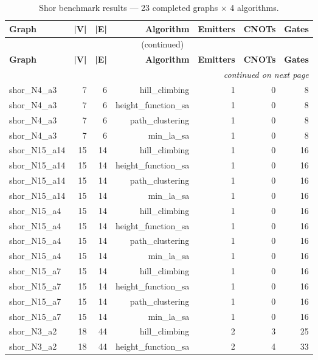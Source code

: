\begin{longtable}{lrrrrrr}
  \caption{Shor benchmark results — 23 completed graphs × 4 algorithms.} \label{tab:shor_results} \\
  \toprule
  \textbf{Graph} & \textbf{|V|} & \textbf{|E|} & \textbf{Algorithm} & \textbf{Emitters} & \textbf{CNOTs} & \textbf{Gates} \\
  \midrule
  \endfirsthead
  \multicolumn{7}{c}{\tablename\ \thetable{} (continued)} \\
  \toprule
  \textbf{Graph} & \textbf{|V|} & \textbf{|E|} & \textbf{Algorithm} & \textbf{Emitters} & \textbf{CNOTs} & \textbf{Gates} \\
  \midrule
  \endhead
  \midrule \multicolumn{7}{r}{\textit{continued on next page}} \\
  \endfoot
  \bottomrule
  \endlastfoot
  shor\_N4\_a3 & 7 & 6 & hill\_climbing & 1 & 0 & 8 \\
  shor\_N4\_a3 & 7 & 6 & height\_function\_sa & 1 & 0 & 8 \\
  shor\_N4\_a3 & 7 & 6 & path\_clustering & 1 & 0 & 8 \\
  shor\_N4\_a3 & 7 & 6 & min\_la\_sa & 1 & 0 & 8 \\
  shor\_N15\_a14 & 15 & 14 & hill\_climbing & 1 & 0 & 16 \\
  shor\_N15\_a14 & 15 & 14 & height\_function\_sa & 1 & 0 & 16 \\
  shor\_N15\_a14 & 15 & 14 & path\_clustering & 1 & 0 & 16 \\
  shor\_N15\_a14 & 15 & 14 & min\_la\_sa & 1 & 0 & 16 \\
  shor\_N15\_a4 & 15 & 14 & hill\_climbing & 1 & 0 & 16 \\
  shor\_N15\_a4 & 15 & 14 & height\_function\_sa & 1 & 0 & 16 \\
  shor\_N15\_a4 & 15 & 14 & path\_clustering & 1 & 0 & 16 \\
  shor\_N15\_a4 & 15 & 14 & min\_la\_sa & 1 & 0 & 16 \\
  shor\_N15\_a7 & 15 & 14 & hill\_climbing & 1 & 0 & 16 \\
  shor\_N15\_a7 & 15 & 14 & height\_function\_sa & 1 & 0 & 16 \\
  shor\_N15\_a7 & 15 & 14 & path\_clustering & 1 & 0 & 16 \\
  shor\_N15\_a7 & 15 & 14 & min\_la\_sa & 1 & 0 & 16 \\
  shor\_N3\_a2 & 18 & 44 & hill\_climbing & 2 & 3 & 25 \\
  shor\_N3\_a2 & 18 & 44 & height\_function\_sa & 2 & 4 & 33 \\

\end{longtable}
